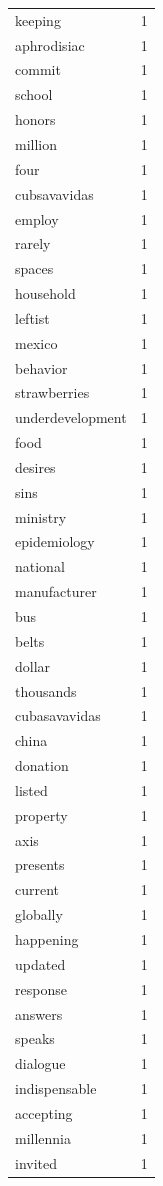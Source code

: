 \begin{tabular}{lr}
keeping & 1 \\
aphrodisiac & 1 \\
commit & 1 \\
school & 1 \\
honors & 1 \\
million & 1 \\
four & 1 \\
cubsavavidas & 1 \\
employ & 1 \\
rarely & 1 \\
spaces & 1 \\
household & 1 \\
leftist & 1 \\
mexico & 1 \\
behavior & 1 \\
strawberries & 1 \\
underdevelopment & 1 \\
food & 1 \\
desires & 1 \\
sins & 1 \\
ministry & 1 \\
epidemiology & 1 \\
national & 1 \\
manufacturer & 1 \\
bus & 1 \\
belts & 1 \\
dollar & 1 \\
thousands & 1 \\
cubasavavidas & 1 \\
china & 1 \\
donation & 1 \\
listed & 1 \\
property & 1 \\
axis & 1 \\
presents & 1 \\
current & 1 \\
globally & 1 \\
happening & 1 \\
updated & 1 \\
response & 1 \\
answers & 1 \\
speaks & 1 \\
dialogue & 1 \\
indispensable & 1 \\
accepting & 1 \\
millennia & 1 \\
invited & 1 \\

\end{tabular}
